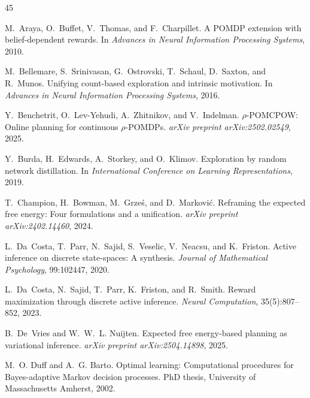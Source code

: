 \documentclass{article}
\begin{document}
{\small

\begin{thebibliography}{45}

M.~Araya, O.~Buffet, V.~Thomas, and F.~Charpillet.
\newblock A {POMDP} extension with belief-dependent rewards.
\newblock In \emph{Advances in Neural Information Processing Systems}, 2010.

M.~Bellemare, S.~Srinivasan, G.~Ostrovski, T.~Schaul, D.~Saxton, and R.~Munos.
\newblock Unifying count-based exploration and intrinsic motivation.
\newblock In \emph{Advances in Neural Information Processing Systems}, 2016.

Y.~Benchetrit, O.~Lev-Yehudi, A.~Zhitnikov, and V.~Indelman.
\newblock $\rho$-{POMCPOW}: Online planning for continuous $\rho$-{POMDP}s.
\newblock \emph{arXiv preprint arXiv:2502.02549}, 2025.

Y.~Burda, H.~Edwards, A.~Storkey, and O.~Klimov.
\newblock Exploration by random network distillation.
\newblock In \emph{International Conference on Learning Representations}, 2019.

T.~Champion, H.~Bowman, M.~Grze\'{s}, and D.~Markovi\'{c}.
\newblock Reframing the expected free energy: Four formulations and a unification.
\newblock \emph{arXiv preprint arXiv:2402.14460}, 2024.

L.~Da~Costa, T.~Parr, N.~Sajid, S.~Veselic, V.~Neacsu, and K.~Friston.
\newblock Active inference on discrete state-spaces: A synthesis.
\newblock \emph{Journal of Mathematical Psychology}, 99:102447, 2020.

L.~Da~Costa, N.~Sajid, T.~Parr, K.~Friston, and R.~Smith.
\newblock Reward maximization through discrete active inference.
\newblock \emph{Neural Computation}, 35(5):807--852, 2023.

B.~De~Vries and W.~W.~L. Nuijten.
\newblock Expected free energy-based planning as variational inference.
\newblock \emph{arXiv preprint arXiv:2504.14898}, 2025.

M.~O. Duff and A.~G. Barto.
\newblock Optimal learning: Computational procedures for {B}ayes-adaptive {M}arkov decision processes.
\newblock PhD thesis, University of Massachusetts Amherst, 2002.


\end{thebibliography}}
\end{document}
